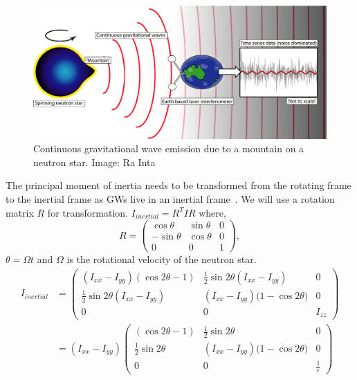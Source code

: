 \documentclass{ttuthes2007}
\begin{document}
\begin{figure}[h!]                                                            
        \includegraphics[width=\textwidth]{figure/CW.png}                 
        \caption{Continuous gravitational wave emission due to a mountain on a
neutron star. Image: Ra Inta}
        \label{fig:CW}                                                 
\end{figure}     
The principal moment of inertia needs to be transformed from the rotating frame to 
the inertial frame as \acp{GW} live in an inertial frame~\cite{PhysRevD.20.351}. 
We will use a rotation matrix $R$ for transformation.
$I_{inertial}= R^T I R$
where, 
\begin{equation}
R=
\begin{pmatrix}
\cos\theta & \sin\theta & 0 \\
-\sin\theta & \cos\theta & 0 \\
0 & 0 & 1
\end{pmatrix},
\end{equation}
$\theta=\Omega t$ and $\Omega$ is the rotational velocity of the neutron star.
\begin{equation}
\begin{split}
I_{inertial}&=
\begin{pmatrix}
(I_{xx}-I_{yy})(\cos{2\theta} -1) & \frac{1}{2}\sin{2\theta}(I_{xx}-I_{yy}) & 0 \\
\frac{1}{2}\sin{2\theta}(I_{xx}-I_{yy}) & (I_{xx}-I_{yy})(1-\cos{2\theta)} & 0  \\
0 & 0 & I_{zz}
\end{pmatrix}\\
&=(I_{xx}-I_{yy})
\begin{pmatrix}
(\cos2\theta -1) & \frac{1}{2}\sin{2\theta} & 0 \\
\frac{1}{2}\sin{2\theta} & (I_{xx}-I_{yy})(1-\cos{2\theta)} & 0  \\
0 & 0 & \frac{1}{\epsilon}
\end{pmatrix}
\end{split}
\end{equation}
\end{document}
